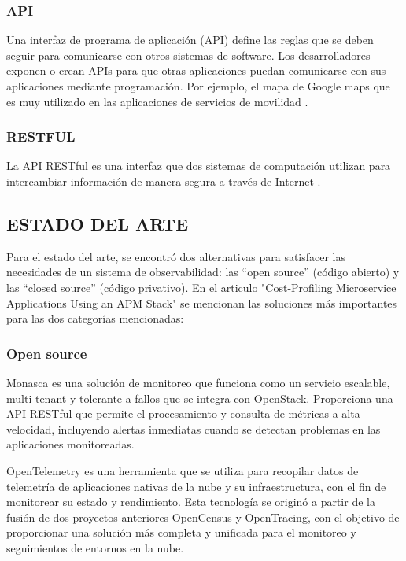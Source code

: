 \documentclass[a4paper,12pt]{article}
\begin{document}
\subsubsection{\small API}

Una interfaz de programa de aplicación (API) define las reglas que se deben seguir para comunicarse 
con otros sistemas de software. Los desarrolladores exponen o crean APIs para que otras aplicaciones
puedan comunicarse con sus aplicaciones mediante programación. Por ejemplo, el mapa de Google maps 
que es muy utilizado en las aplicaciones de servicios de movilidad \cite{APIRESTful}.

\subsubsection{\small RESTFUL}

La API RESTful es una interfaz que dos sistemas de computación utilizan para intercambiar información 
de manera segura a través de Internet \cite{APIRESTful}.


\subsection{\normalsize ESTADO DEL ARTE}
Para el estado del arte, se encontró dos alternativas para satisfacer las necesidades de un sistema de observabilidad: las “open source” (código abierto) y las “closed source” (código privativo). En el articulo "Cost-Profiling Microservice Applications Using an APM Stack"  \cite{cost-profiling} se mencionan las soluciones más importantes para las dos categorías mencionadas:

\subsubsection{\small Open source}
Monasca es una solución de monitoreo que funciona como un servicio escalable, multi-tenant y tolerante a fallos que se integra con OpenStack. Proporciona una API RESTful que permite el procesamiento y consulta de métricas a alta velocidad, incluyendo alertas inmediatas cuando se detectan problemas en las aplicaciones monitoreadas.
\vspace{12pt}

OpenTelemetry es una herramienta que se utiliza para recopilar datos de telemetría de aplicaciones nativas de la nube y su infraestructura, con el fin de monitorear su estado y rendimiento. Esta tecnología se originó a partir de la fusión de dos proyectos anteriores OpenCensus y OpenTracing, con el objetivo de proporcionar una solución más completa y unificada para el monitoreo y seguimientos de entornos en la nube.
\vspace{12pt}
\end{document}

